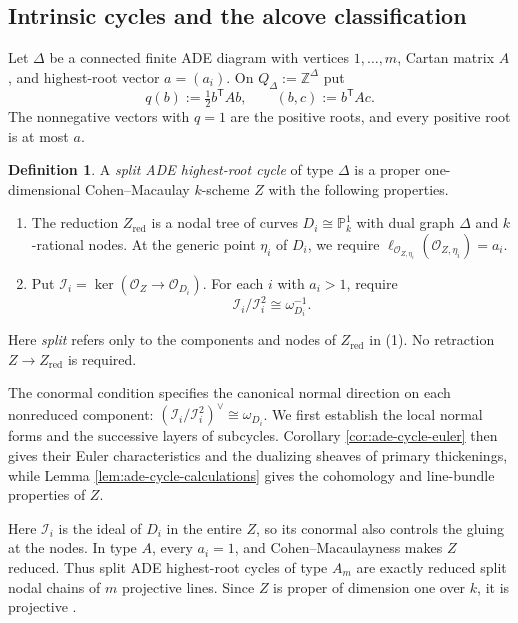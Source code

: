 \documentclass[a4paper,reqno]{amsart}
\def\I{\mathcal{I}}
\def\O{\mathcal{O}}
\theoremstyle{definition}
\newtheorem{Def}[Thm]{Definition}
\begin{document}
\subsection{Intrinsic cycles and the alcove classification}

Let $\Delta$ be a connected finite ADE diagram with vertices $1,\ldots,m$, Cartan matrix $A$, and highest-root vector $a=(a_i)$. On $Q_\Delta:=\mathbb Z^\Delta$ put
\[
q(b):=\tfrac12 b^{\mathsf T}Ab,\qquad (b,c):=b^{\mathsf T}Ac.
\]
The nonnegative vectors with $q=1$ are the positive roots, and every positive root is at most $a$.

\begin{Def}\label{def:ade-cycle-scheme}
A \emph{split ADE highest-root cycle} of type $\Delta$ is a proper one-dimensional Cohen--Macaulay $k$-scheme $Z$ with the following properties.
\begin{enumerate}
\item The reduction $Z_{\mathrm{red}}$ is a nodal tree of curves $D_i\cong\mathbb P^1_k$ with dual graph $\Delta$ and $k$-rational nodes. At the generic point $\eta_i$ of $D_i$, we require $\ell_{\O_{Z,\eta_i}}(\O_{Z,\eta_i})=a_i$.
\item Put $\I_i=\ker(\O_Z\to\O_{D_i})$. For each $i$ with $a_i>1$, require
\begin{equation}\label{eq:ade-conormal}
\I_i/\I_i^2\cong\omega_{D_i}^{-1}.
\end{equation}
\end{enumerate}
Here \emph{split} refers only to the components and nodes of $Z_{\mathrm{red}}$ in (1). No retraction $Z\to Z_{\mathrm{red}}$ is required.
\end{Def}

The conormal condition specifies the canonical normal direction on each nonreduced component: $(\I_i/\I_i^2)^\vee\cong\omega_{D_i}$. We first establish the local normal forms and the successive layers of subcycles. Corollary \ref{cor:ade-cycle-euler} then gives their Euler characteristics and the dualizing sheaves of primary thickenings, while Lemma \ref{lem:ade-cycle-calculations} gives the cohomology and line-bundle properties of $Z$.

Here $\I_i$ is the ideal of $D_i$ in the entire $Z$, so its conormal also controls the gluing at the nodes. In type $A$, every $a_i=1$, and Cohen--Macaulayness makes $Z$ reduced. Thus split ADE highest-root cycles of type $A_m$ are exactly reduced split nodal chains of $m$ projective lines. Since $Z$ is proper of dimension one over $k$, it is projective \cite[Tag 0A26]{stacks-project}.
\end{document}

